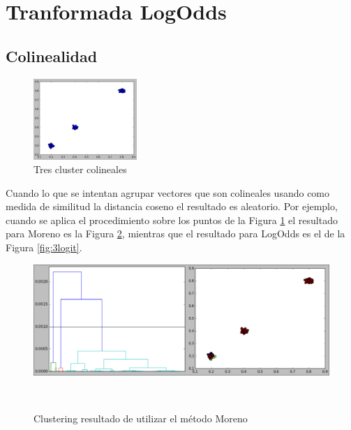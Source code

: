 \section{Tranformada LogOdds}

\subsection{Colinealidad}

\begin{figure}
    \begin{center}
        \vspace{-1cm}
        \includegraphics[width=0.35\textwidth]{img/3pop.png}
        \caption{Tres cluster colineales\-}
        \label{fig:3clusters}
    \end{center}
\end{figure} 

Cuando lo que se intentan agrupar vectores que son colineales usando como medida
de similitud la distancia coseno el resultado es aleatorio. Por ejemplo, cuando
se aplica el procedimiento sobre los puntos de la Figura \ref{fig:3clusters}
el resultado para Moreno es la Figura \ref{fig:3moreno}, mientras que el resultado
para LogOdds es el de la Figura \ref{fig:3logit}.\\

\vspace{1.5cm}

\begin{figure}[h!]
                                                                                                                        
\begin{minipage}[b]{\textwidth}
    \includegraphics[width=\textwidth]{img/3pop_moreno.png}
    \caption{Clustering resultado de utilizar el m\'etodo Moreno}
    \label{fig:3moreno}
\end{minipage} ~

\end{figure}  


